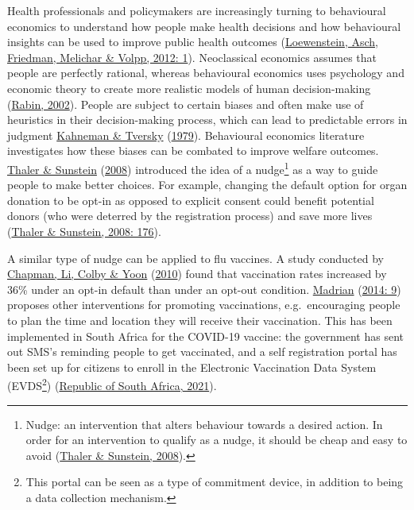 \documentclass[11pt,preprint, authoryear]{elsarticle}
\numberwithin{equation}{section}
\numberwithin{figure}{section}
\numberwithin{table}{section}
\let\rmarkdownfootnote\footnote%
\def\footnote{\protect\rmarkdownfootnote}
\begin{document}
Health professionals and policymakers are increasingly turning to
behavioural economics to understand how people make health decisions and
how behavioural insights can be used to improve public health outcomes
(\protect\hyperlink{ref-health}{Loewenstein, Asch, Friedman, Melichar \&
Volpp, 2012: 1}). Neoclassical economics assumes that people are
perfectly rational, whereas behavioural economics uses psychology and
economic theory to create more realistic models of human decision-making
(\protect\hyperlink{ref-rabin}{Rabin, 2002}). People are subject to
certain biases and often make use of heuristics in their decision-making
process, which can lead to predictable errors in judgment
\protect\hyperlink{ref-prospect}{Kahneman \& Tversky}
(\protect\hyperlink{ref-prospect}{1979}). Behavioural economics
literature investigates how these biases can be combated to improve
welfare outcomes. \protect\hyperlink{ref-nudge}{Thaler \& Sunstein}
(\protect\hyperlink{ref-nudge}{2008}) introduced the idea of a
nudge\footnote{Nudge: an intervention that alters behaviour towards a
  desired action. In order for an intervention to qualify as a nudge, it
  should be cheap and easy to avoid
  (\protect\hyperlink{ref-nudge}{Thaler \& Sunstein, 2008}).} as a way
to guide people to make better choices. For example, changing the
default option for organ donation to be opt-in as opposed to explicit
consent could benefit potential donors (who were deterred by the
registration process) and save more lives
(\protect\hyperlink{ref-nudge}{Thaler \& Sunstein, 2008: 176}).

A similar type of nudge can be applied to flu vaccines. A study
conducted by \protect\hyperlink{ref-opt}{Chapman, Li, Colby \& Yoon}
(\protect\hyperlink{ref-opt}{2010}) found that vaccination rates
increased by 36\% under an opt-in default than under an opt-out
condition. \protect\hyperlink{ref-flu}{Madrian}
(\protect\hyperlink{ref-flu}{2014: 9}) proposes other interventions for
promoting vaccinations, e.g.~encouraging people to plan the time and
location they will receive their vaccination. This has been implemented
in South Africa for the COVID-19 vaccine: the government has sent out
SMS's reminding people to get vaccinated, and a self registration portal
has been set up for citizens to enroll in the Electronic Vaccination
Data System (EVDS\footnote{This portal can be seen as a type of
  commitment device, in addition to being a data collection mechanism.})
(\protect\hyperlink{ref-evds}{Republic of South Africa, 2021}).
\end{document}
